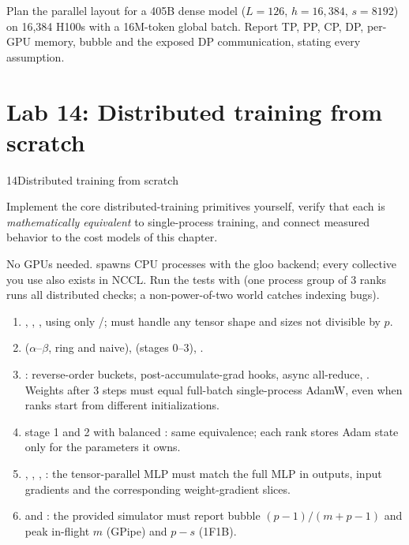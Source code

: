 \begin{exercise}
Plan the parallel layout for a 405B dense model ($L=126$, $h=16{,}384$, $s=8192$) on 16{,}384
H100s with a 16M-token global batch. Report TP, PP, CP, DP, per-GPU memory, bubble and the
exposed DP communication, stating every assumption.
\end{exercise}

\section{Lab 14: Distributed training from scratch}\label{sec:dist:lab}

\begin{labbox}{14}{Distributed training from scratch}

Implement the core distributed-training primitives yourself, verify that each is
\emph{mathematically equivalent} to single-process training, and connect measured behavior to
the cost models of this chapter.

No GPUs needed.  spawns CPU processes
with the gloo backend; every collective you use also exists in NCCL. Run the tests with
 (one process group of 3
ranks runs all distributed checks; a non-power-of-two world catches indexing bugs).

\begin{enumerate}
\item {}, , ,
   using only /; must handle any tensor shape and
  sizes not divisible by $p$.
\item {} ($\alpha$--$\beta$, ring and naive), 
  (stages 0--3), .
\item {}: reverse-order buckets, post-accumulate-grad hooks, async all-reduce,
  . Weights after 3 steps must equal full-batch
  single-process AdamW, even when ranks start from different initializations.
\item {} stage 1 and 2 with balanced : same equivalence;
  each rank stores Adam state only for the parameters it owns.
\item {}, , ,
  : the tensor-parallel MLP must match the full MLP in outputs, input
  gradients and the corresponding weight-gradient slices.
\item {} and : the provided simulator must report bubble
  $(p-1)/(m+p-1)$ and peak in-flight $m$ (GPipe) and $p-s$ (1F1B).
\end{enumerate}


\end{labbox}
